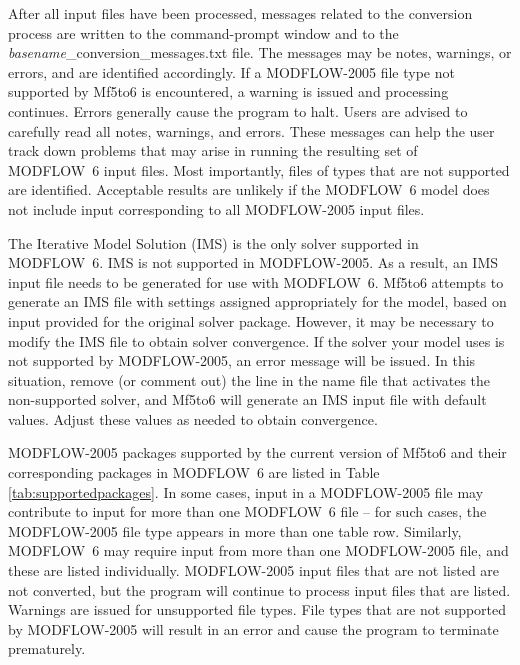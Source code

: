 \documentclass[11pt,twoside,twocolumn]{usgsreport}
\newcommand{\programname}{Mf5to6}
\newcommand{\mfname}{MODFLOW~6}
\begin{document}
After all input files have been processed, messages related to the conversion process are written to the command-prompt window and to the \textit{basename}\_conversion\_messages.txt file. The messages may be notes, warnings, or errors, and are identified accordingly. If a MODFLOW-2005 file type not supported by \programname{} is encountered, a warning is issued and processing continues. Errors generally cause the program to halt. Users are advised to carefully read all notes, warnings, and errors. These messages can help the user track down problems that may arise in running the resulting set of \mfname{} input files. Most importantly, files of types that are not supported are identified. Acceptable results are unlikely if the \mfname{} model does not include input corresponding to all MODFLOW-2005 input files. 

The Iterative Model Solution (IMS) is the only solver supported in \mfname{}. IMS is not supported in MODFLOW-2005. As a result, an IMS input file needs to be generated for use with \mfname{}. \programname{} attempts to generate an IMS file with settings assigned appropriately for the model, based on input provided for the original solver package. However, it may be necessary to modify the IMS file to obtain solver convergence. If the solver your model uses is not supported by MODFLOW-2005, an error message will be issued. In this situation, remove (or comment out) the line in the name file that activates the non-supported solver, and \programname{} will generate an IMS input file with default values. Adjust these values as needed to obtain convergence.


MODFLOW-2005 packages supported by the current version of \programname{} and their corresponding packages in \mfname{} are listed in Table \ref{tab:supportedpackages}. In some cases, input in a MODFLOW-2005 file may contribute to input for more than one \mfname{} file -- for such cases, the MODFLOW-2005 file type appears in more than one table row. Similarly, \mfname{} may require input from more than one MODFLOW-2005 file, and these are listed individually. MODFLOW-2005 input files that are not listed are not converted, but the program will continue to process input files that are listed. Warnings are issued for unsupported file types. File types that are not supported by MODFLOW-2005 will result in an error and cause the program to terminate prematurely.
\end{document}
